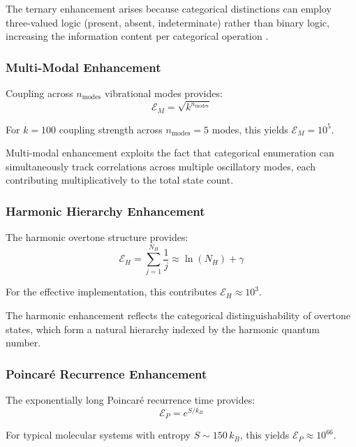 \documentclass[twocolumn,10pt]{article}
\begin{document}
The ternary enhancement arises because categorical distinctions can employ three-valued logic (present, absent, indeterminate) rather than binary logic, increasing the information content per categorical operation \cite{shannon1948}.

\subsubsection{Multi-Modal Enhancement}

Coupling across $n_{\text{modes}}$ vibrational modes provides:
\begin{equation}
    \mathcal{E}_M = \sqrt{k^{n_{\text{modes}}}}
\end{equation}

For $k = 100$ coupling strength across $n_{\text{modes}} = 5$ modes, this yields $\mathcal{E}_M = 10^5$.

Multi-modal enhancement exploits the fact that categorical enumeration can simultaneously track correlations across multiple oscillatory modes, each contributing multiplicatively to the total state count.

\subsubsection{Harmonic Hierarchy Enhancement}

The harmonic overtone structure provides:
\begin{equation}
    \mathcal{E}_H = \sum_{j=1}^{N_H} \frac{1}{j} \approx \ln(N_H) + \gamma
\end{equation}

For the effective implementation, this contributes $\mathcal{E}_H \approx 10^3$.

The harmonic enhancement reflects the categorical distinguishability of overtone states, which form a natural hierarchy indexed by the harmonic quantum number.

\subsubsection{Poincar\'{e} Recurrence Enhancement}

The exponentially long Poincar\'{e} recurrence time \cite{poincare1890} provides:
\begin{equation}
    \mathcal{E}_P = e^{S/k_B}
\end{equation}

For typical molecular systems with entropy $S \sim 150 \, k_B$, this yields $\mathcal{E}_P \approx 10^{66}$.
\end{document}
